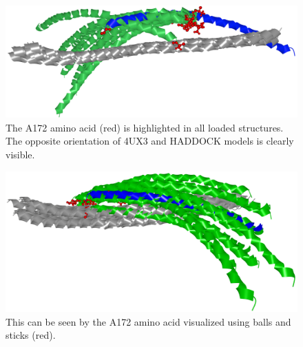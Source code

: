 \documentclass{bmcart}
\begin{document}
\begin{backmatter}
\begin{figure}[h!]
  \centering
  \includegraphics[width=0.9\columnwidth]{images/figure11.png}
  \caption{ The A172 amino acid (red) is highlighted in all loaded structures. The opposite orientation of 4UX3 and HADDOCK models is clearly visible.}
  \label{fig:coiled_haddock}
\end{figure}

\begin{figure}[h!]
  \centering
  \includegraphics[width=0.9\columnwidth]{images/figure12.png}
  \caption{ This can be seen by the A172 amino acid visualized using balls and sticks (red).}
  \label{fig:selection2SMC3PyDock}
\end{figure}


\end{backmatter}
\end{document}
